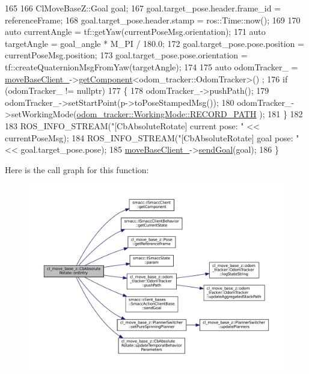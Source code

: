 \begin{DoxyCode}
165 
166   ClMoveBaseZ::Goal goal;
167   goal.target\_pose.header.frame\_id = referenceFrame;
168   goal.target\_pose.header.stamp = ros::Time::now();
169 
170   \textcolor{keyword}{auto} currentAngle = tf::getYaw(currentPoseMsg.orientation);
171   \textcolor{keyword}{auto} targetAngle = goal\_angle * M\_PI / 180.0;
172   goal.target\_pose.pose.position = currentPoseMsg.position;
173   goal.target\_pose.pose.orientation = tf::createQuaternionMsgFromYaw(targetAngle);
174 
175   \textcolor{keyword}{auto} odomTracker\_ = \hyperlink{classcl__move__base__z_1_1CbMoveBaseClientBehaviorBase_ab2ef219464cfac8659b4a87c8d0db6d5}{moveBaseClient\_}->\hyperlink{classsmacc_1_1ISmaccClient_adef78db601749ca63c19e74a27cb88cc}{getComponent}<odom\_tracker::OdomTracker>()
      ;
176   \textcolor{keywordflow}{if} (odomTracker\_ != \textcolor{keyword}{nullptr})
177   \{
178     odomTracker\_->pushPath();
179     odomTracker\_->setStartPoint(p->toPoseStampedMsg());
180     odomTracker\_->setWorkingMode(\hyperlink{namespacecl__move__base__z_1_1odom__tracker_ac46b05813b2791604f6cd0a39ace3ef8a023bc3adf68871ef7a0c616765ac80a7}{odom\_tracker::WorkingMode::RECORD\_PATH}
      );
181   \}
182 
183   ROS\_INFO\_STREAM(\textcolor{stringliteral}{"[CbAbsoluteRotate] current pose: "} << currentPoseMsg);
184   ROS\_INFO\_STREAM(\textcolor{stringliteral}{"[CbAbsoluteRotate] goal pose: "} << goal.target\_pose.pose);
185   \hyperlink{classcl__move__base__z_1_1CbMoveBaseClientBehaviorBase_ab2ef219464cfac8659b4a87c8d0db6d5}{moveBaseClient\_}->\hyperlink{classsmacc_1_1client__bases_1_1SmaccActionClientBase_a9c47a5094ac8afb01680307fe5eca922}{sendGoal}(goal);
186 \}
\end{DoxyCode}
Here is the call graph for this function\+:
\nopagebreak
\begin{figure}[H]
\begin{center}
\leavevmode
\includegraphics[width=350pt]{classcl__move__base__z_1_1CbAbsoluteRotate_a10418ea360809fa649d295716b152b2b_cgraph}
\end{center}
\end{figure}
